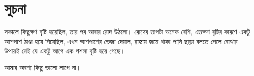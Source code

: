 \section{সুচনা}
সকালে কিছুক্ষণ বৃষ্টি হয়েছিল, তার পর আবার রোদ উঠলো। রোদের তাপটা অনেক বেশি, এতক্ষণ বৃষ্টির কারণে একটু আশপাশ ঠাণ্ডা হয়ে গিয়েছিল, এখন আশপাশের ভেজা দেয়াল, রাস্তায় জমে থাকা পানি ছাড়া বলতে গেলে বোঝার উপায়ই নেই যে একটু আগে এক পশলা বৃষ্টি হয়ে গেছে।

আমার অবশ্য কিছু ভালো লাগে না। 

